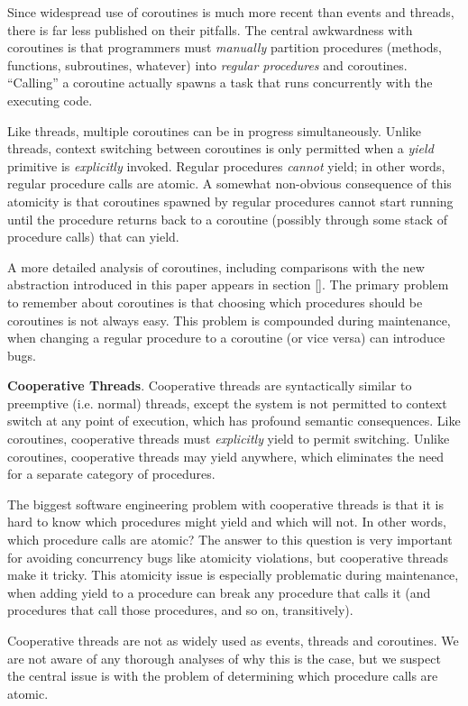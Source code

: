 \documentclass[10pt,preprint]{sigplanconf}
\begin{document}
Since widespread use of coroutines is much more recent than events and threads, there is far less published on their pitfalls.
The central awkwardness with coroutines is that programmers must \emph{manually} partition procedures (methods, functions, subroutines, whatever) into \emph{regular procedures} and coroutines.
``Calling'' a coroutine actually spawns a task that runs concurrently with the executing code.

Like threads, multiple coroutines can be in progress simultaneously.
Unlike threads, context switching between coroutines is only permitted when a \emph{yield} primitive is \emph{explicitly} invoked.
Regular procedures \emph{cannot} yield; in other words, regular procedure calls are atomic.
A somewhat non-obvious consequence of this atomicity is that coroutines spawned by regular procedures cannot start running until the procedure returns back to a coroutine (possibly through some stack of procedure calls) that can yield.

A more detailed analysis of coroutines, including comparisons with the new abstraction introduced in this paper appears in section \ref{}.
The primary problem to remember about coroutines is that choosing which procedures should be coroutines is not always easy.
This problem is compounded during maintenance, when changing a regular procedure to a coroutine (or vice versa) can introduce bugs.

\textbf{Cooperative Threads}.
Cooperative threads are syntactically similar to preemptive (i.e. normal) threads, except the system is not permitted to context switch at any point of execution, which has profound semantic consequences.
Like coroutines, cooperative threads must \emph{explicitly} yield to permit switching.
Unlike coroutines, cooperative threads may yield anywhere, which eliminates the need for a separate category of procedures.

The biggest software engineering problem with cooperative threads is that it is hard to know which procedures might yield and which will not.
In other words, which procedure calls are atomic?
The answer to this question is very important for avoiding concurrency bugs like atomicity violations, but cooperative threads make it tricky.
This atomicity issue is especially problematic during maintenance, when adding yield to a procedure can break any procedure that calls it (and procedures that call those procedures, and so on, transitively).

Cooperative threads are not as widely used as events, threads and coroutines.
We are not aware of any thorough analyses of why this is the case, but we suspect the central issue is with the problem of determining which procedure calls are atomic.
\end{document}
